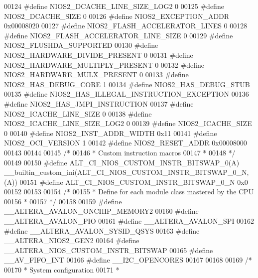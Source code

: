 \begin{DoxyCode}
00124 \textcolor{preprocessor}{#define NIOS2\_DCACHE\_LINE\_SIZE\_LOG2 0}
00125 \textcolor{preprocessor}{#define NIOS2\_DCACHE\_SIZE 0}
00126 \textcolor{preprocessor}{#define NIOS2\_EXCEPTION\_ADDR 0x00008020}
00127 \textcolor{preprocessor}{#define NIOS2\_FLASH\_ACCELERATOR\_LINES 0}
00128 \textcolor{preprocessor}{#define NIOS2\_FLASH\_ACCELERATOR\_LINE\_SIZE 0}
00129 \textcolor{preprocessor}{#define NIOS2\_FLUSHDA\_SUPPORTED}
00130 \textcolor{preprocessor}{#define NIOS2\_HARDWARE\_DIVIDE\_PRESENT 0}
00131 \textcolor{preprocessor}{#define NIOS2\_HARDWARE\_MULTIPLY\_PRESENT 0}
00132 \textcolor{preprocessor}{#define NIOS2\_HARDWARE\_MULX\_PRESENT 0}
00133 \textcolor{preprocessor}{#define NIOS2\_HAS\_DEBUG\_CORE 1}
00134 \textcolor{preprocessor}{#define NIOS2\_HAS\_DEBUG\_STUB}
00135 \textcolor{preprocessor}{#define NIOS2\_HAS\_ILLEGAL\_INSTRUCTION\_EXCEPTION}
00136 \textcolor{preprocessor}{#define NIOS2\_HAS\_JMPI\_INSTRUCTION}
00137 \textcolor{preprocessor}{#define NIOS2\_ICACHE\_LINE\_SIZE 0}
00138 \textcolor{preprocessor}{#define NIOS2\_ICACHE\_LINE\_SIZE\_LOG2 0}
00139 \textcolor{preprocessor}{#define NIOS2\_ICACHE\_SIZE 0}
00140 \textcolor{preprocessor}{#define NIOS2\_INST\_ADDR\_WIDTH 0x11}
00141 \textcolor{preprocessor}{#define NIOS2\_OCI\_VERSION 1}
00142 \textcolor{preprocessor}{#define NIOS2\_RESET\_ADDR 0x00008000}
00143 
00144 
00145 \textcolor{comment}{/*}
00146 \textcolor{comment}{ * Custom instruction macros}
00147 \textcolor{comment}{ *}
00148 \textcolor{comment}{ */}
00149 
00150 \textcolor{preprocessor}{#define ALT\_CI\_NIOS\_CUSTOM\_INSTR\_BITSWAP\_0(A)
       \_\_builtin\_custom\_ini(ALT\_CI\_NIOS\_CUSTOM\_INSTR\_BITSWAP\_0\_N,(A))}
00151 \textcolor{preprocessor}{#define ALT\_CI\_NIOS\_CUSTOM\_INSTR\_BITSWAP\_0\_N 0x0}
00152 
00153 
00154 \textcolor{comment}{/*}
00155 \textcolor{comment}{ * Define for each module class mastered by the CPU}
00156 \textcolor{comment}{ *}
00157 \textcolor{comment}{ */}
00158 
00159 \textcolor{preprocessor}{#define \_\_ALTERA\_AVALON\_ONCHIP\_MEMORY2}
00160 \textcolor{preprocessor}{#define \_\_ALTERA\_AVALON\_PIO}
00161 \textcolor{preprocessor}{#define \_\_ALTERA\_AVALON\_SPI}
00162 \textcolor{preprocessor}{#define \_\_ALTERA\_AVALON\_SYSID\_QSYS}
00163 \textcolor{preprocessor}{#define \_\_ALTERA\_NIOS2\_GEN2}
00164 \textcolor{preprocessor}{#define \_\_ALTERA\_NIOS\_CUSTOM\_INSTR\_BITSWAP}
00165 \textcolor{preprocessor}{#define \_\_AV\_FIFO\_INT}
00166 \textcolor{preprocessor}{#define \_\_I2C\_OPENCORES}
00167 
00168 
00169 \textcolor{comment}{/*}
00170 \textcolor{comment}{ * System configuration}
00171 \textcolor{comment}{ *}

\end{DoxyCode}
